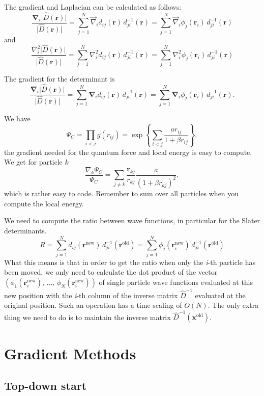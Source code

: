 \documentclass[%
oneside,                 %
final,                   %
10pt]{article}
\begin{document}
The gradient and
Laplacian can be calculated as follows:
\[
\frac{\mathbf{\nabla}_i\vert\hat{D}(\mathbf{r})\vert}
{\vert\hat{D}(\mathbf{r})\vert} =
\sum_{j=1}^N \vec\nabla_i d_{ij}(\mathbf{r})\,
d_{ji}^{-1}(\mathbf{r}) =
\sum_{j=1}^N \vec\nabla_i \phi_j(\mathbf{r}_i)\,
d_{ji}^{-1}(\mathbf{r})
\]
and
\[
\frac{\nabla^2_i\vert\hat{D}(\mathbf{r})\vert}
{\vert\hat{D}(\mathbf{r})\vert} =
\sum_{j=1}^N \nabla^2_i d_{ij}(\mathbf{r})\,
d_{ji}^{-1}(\mathbf{r}) =
\sum_{j=1}^N \nabla^2_i \phi_j(\mathbf{r}_i)\,
d_{ji}^{-1}(\mathbf{r})
\]

The gradient for the determinant is 
\[
\frac{\mathbf{\nabla}_i\vert\hat{D}(\mathbf{r})\vert}
{\vert\hat{D}(\mathbf{r})\vert} =
\sum_{j=1}^N \mathbf{\nabla}_i d_{ij}(\mathbf{r})\,
d_{ji}^{-1}(\mathbf{r}) =
\sum_{j=1}^N \mathbf{\nabla}_i \phi_j(\mathbf{r}_i)\,
d_{ji}^{-1}(\mathbf{r}).
\]

We have
\[
\Psi_C=\prod_{i< j}g(r_{ij})= \exp{\left\{\sum_{i<j}\frac{ar_{ij}}{1+\beta r_{ij}}\right\}},
\]
the gradient needed for the quantum force and local energy is easy to compute.  
We get for particle  $k$
\[
\frac{ \nabla_k \Psi_C}{ \Psi_C }= \sum_{j\ne k}\frac{\mathbf{r}_{kj}}{r_{kj}}\frac{a}{(1+\beta r_{kj})^2},
\]
which is rather easy to code.  Remember to sum over all particles  when you compute the local energy.

We need to compute the ratio between wave functions, in particular  for the Slater determinants.
\[
R =\sum_{j=1}^N d_{ij}(\mathbf{r}^{\mathrm{new}})\,
d_{ji}^{-1}(\mathbf{r}^{\mathrm{old}}) = 
\sum_{j=1}^N \phi_j(\mathbf{r}_i^{\mathrm{new}})\,
d_{ji}^{-1}(\mathbf{r}^{\mathrm{old}})
\]
What this means is that in order to get the ratio when only the \emph{i}-th
particle  has been moved, we only need to calculate the dot
product of the vector $\left(\phi_1(\mathbf{r}_i^\mathrm{new}),\,\dots,\,
\phi_N(\mathbf{r}_i^\mathrm{new})\right)$ of single particle  wave functions
evaluated at this new position with the \emph{i}-th column of the inverse
matrix $\hat{D}^{-1}$ evaluated at the original position. Such
an operation has a time scaling of $O(N)$. The only extra thing we
need to do is to maintain the inverse matrix 
$\hat{D}^{-1}(\mathbf{x}^{\mathrm{old}})$.

\section*{Gradient Methods}

\subsection*{Top-down start}
\end{document}
